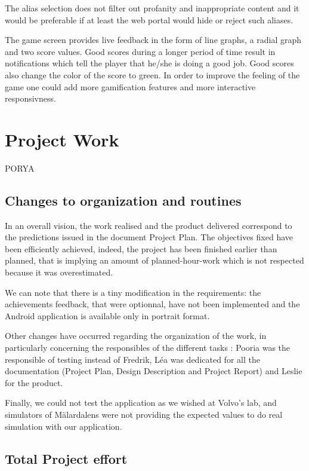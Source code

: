 \documentclass{article}
\begin{document}
The alias selection does not filter out profanity and inappropriate content and it would be preferable if at least the web portal would hide or reject such aliases.

The game screen provides live feedback in the form of line graphs, a radial graph and two score values. Good scores during a longer period of time result in notifications which tell the player that he/she is doing a good job. Good scores also change the color of the score to green. In order to improve the feeling of the game one could add more gamification features and more interactive responsivness.

\section{Project Work}

PORYA

\subsection{Changes to organization and routines}

In an overall vision, the work realised and the product delivered correspond to the predictions issued in the document Project Plan. The objectives fixed have been efficiently achieved, indeed, the project has been finished earlier than planned, that is implying an amount of planned-hour-work which is not respected because it was overestimated.

We can note that there is a tiny modification in the requirements: the achievements feedback, that were optionnal, have not been implemented and the Android application is available only in portrait format.

Other changes have occurred regarding the organization of the work, in particularly concerning the responsibles of the different tasks : Pooria was the responsible of testing instead of Fredrik, L\'ea was dedicated for all the documentation (Project Plan, Design Description and Project Report) and Leslie for the product.

Finally, we could not test the application as we wished at Volvo's lab, and simulators of Mälardalens were not providing the expected values to do real simulation with our application.

\newpage

\subsection{Total Project effort}
\end{document}
